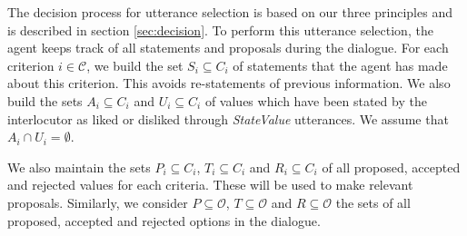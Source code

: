 \documentclass{llncs}
\begin{document}
		\medskip
		The decision process for utterance selection is based on our three principles and is described in section \ref{sec:decision}. To perform this utterance selection, the agent keeps track of all statements and proposals during the dialogue. For each criterion $i\in\mathcal{C}$, we build the set $S_i \subseteq C_i$ of statements that the agent has made about this criterion. This avoids re-statements of previous information. We also build the sets $A_i\subseteq C_i$ and $U_i\subseteq C_i$ of values which have been stated by the interlocutor as liked or disliked through \emph{StateValue} utterances. We assume that $A_i\cap U_i=\emptyset$.
		
		We also maintain the sets $P_i \subseteq C_i$, $T_i\subseteq C_i$ and $R_i\subseteq C_i$ of all proposed, accepted and rejected values for each criteria. These will be used to make relevant proposals. Similarly, we consider $P\subseteq \mathcal{O}$, $T\subseteq \mathcal{O}$ and $R\subseteq \mathcal{O}$ the sets of all proposed, accepted and rejected options in the dialogue.
		 
\end{document}
